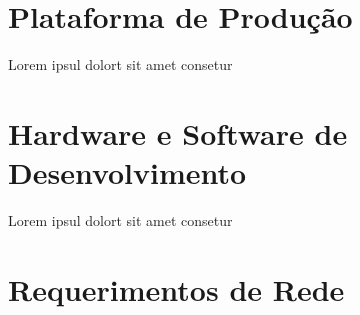 
\section{Plataforma de Produção}

Lorem ipsul dolort sit amet consetur

\section{Hardware e Software de Desenvolvimento}

Lorem ipsul dolort sit amet consetur

\section{Requerimentos de Rede}
